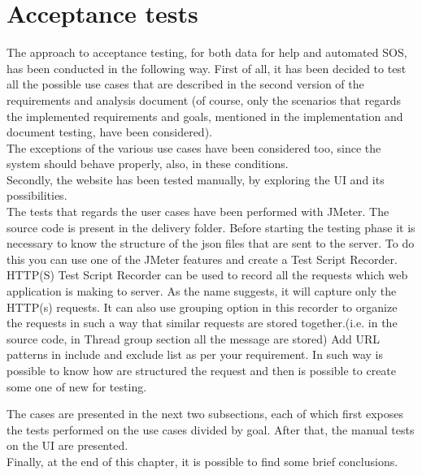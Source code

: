 \section{Acceptance tests}
The approach to acceptance testing, for both data for help and automated SOS, has been
conducted in the following way. 
First of all, it has been decided to test all the possible use cases that are described in the
second version of the requirements and analysis document (of course, only the scenarios that
regards the implemented requirements and goals, mentioned in the implementation and document testing, have been considered). \\
The exceptions of the various use cases have been considered too, since the system should
behave properly, also, in these conditions. \\
Secondly, the website has been tested manually, by exploring the UI and its possibilities. \\

The tests that regards the user cases have been performed with JMeter. The source code is present in the delivery folder. 
Before starting the testing phase it is necessary to know the structure of the json files that are sent to the server. To do this you can use
one of the JMeter features and create a Test Script Recorder. HTTP(S) Test Script Recorder can be used to record all the requests which web
application is making to server. As the name suggests, it will capture only the HTTP(s) requests. It can also use grouping option in this
recorder to organize the requests in such a way that similar requests are stored together.(i.e. in the source code, in Thread group section
all the message are stored) Add URL patterns in include and exclude list as per your requirement. In such way is possible to know how are
structured the request and then is possible to create some one of new for testing.

\par
The cases are presented in the next two subsections, each of which first exposes the
tests performed on the use cases divided by goal. After that, the manual tests on the UI are presented. \\
Finally, at the end of this chapter, it is possible to find some brief conclusions. 




